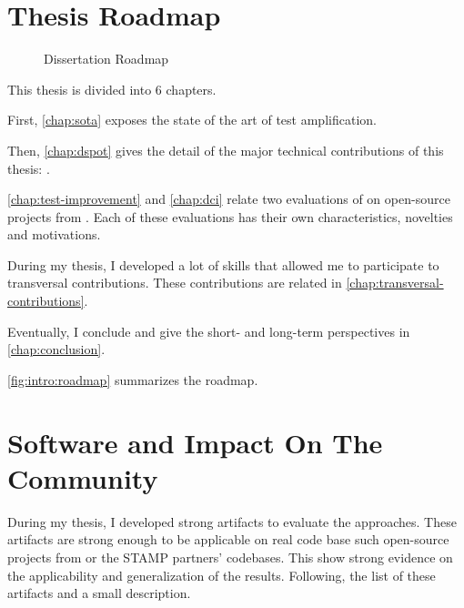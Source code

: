 \section{Thesis Roadmap}
\label{sec:intro:roadmap}

\begin{figure}[h]
	\centering
	\caption{Dissertation Roadmap}
	\label{fig:intro:roadmap}
\end{figure}

This thesis is divided into 6 chapters.

First, \autoref{chap:sota} exposes the state of the art of test amplification.

Then, \autoref{chap:dspot} gives the detail of the major technical contributions of this thesis: \dspot.

\autoref{chap:test-improvement} and \autoref{chap:dci} relate two evaluations of \dspot on open-source projects from \gh.
Each of these evaluations has their own characteristics, novelties and motivations.

During my thesis, I developed a lot of skills that allowed me to participate to transversal contributions. 
These contributions are related in \autoref{chap:transversal-contributions}.

Eventually, I conclude and give the short- and long-term perspectives in \autoref{chap:conclusion}.

\autoref{fig:intro:roadmap} summarizes the roadmap.

\section{Software and Impact On The Community}
\label{sec:intro:software}

During my thesis, I developed strong artifacts to evaluate the approaches.
These artifacts are strong enough to be applicable on real code base such open-source projects from \gh or the STAMP partners' codebases.
This show strong evidence on the applicability and generalization of the results.
Following, the list of these artifacts and a small description.

